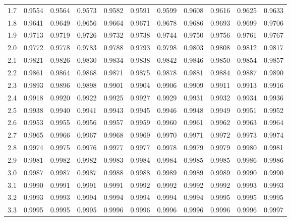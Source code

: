 {\begin{tabularx}{\textwidth}{p{0.5cm}ZZZZZZZZZZ}
1.7& 0.9554& 0.9564& 0.9573& 0.9582& 0.9591& 0.9599& 0.9608& 0.9616& 0.9625& 0.9633\\ 
1.8& 0.9641& 0.9649& 0.9656& 0.9664& 0.9671& 0.9678& 0.9686& 0.9693& 0.9699& 0.9706\\ 
1.9& 0.9713& 0.9719& 0.9726& 0.9732& 0.9738& 0.9744& 0.9750& 0.9756& 0.9761& 0.9767\\ 
2.0& 0.9772& 0.9778& 0.9783& 0.9788& 0.9793& 0.9798& 0.9803& 0.9808& 0.9812& 0.9817\\ 
2.1& 0.9821& 0.9826& 0.9830& 0.9834& 0.9838& 0.9842& 0.9846& 0.9850& 0.9854& 0.9857\\ 
2.2& 0.9861& 0.9864& 0.9868& 0.9871& 0.9875& 0.9878& 0.9881& 0.9884& 0.9887& 0.9890\\ 
2.3& 0.9893& 0.9896& 0.9898& 0.9901& 0.9904& 0.9906& 0.9909& 0.9911& 0.9913& 0.9916\\ 
2.4& 0.9918& 0.9920& 0.9922& 0.9925& 0.9927& 0.9929& 0.9931& 0.9932& 0.9934& 0.9936\\ 
2.5& 0.9938& 0.9940& 0.9941& 0.9943& 0.9945& 0.9946& 0.9948& 0.9949& 0.9951& 0.9952\\ 
2.6& 0.9953& 0.9955& 0.9956& 0.9957& 0.9959& 0.9960& 0.9961& 0.9962& 0.9963& 0.9964\\ 
2.7& 0.9965& 0.9966& 0.9967& 0.9968& 0.9969& 0.9970& 0.9971& 0.9972& 0.9973& 0.9974\\ 
2.8& 0.9974& 0.9975& 0.9976& 0.9977& 0.9977& 0.9978& 0.9979& 0.9979& 0.9980& 0.9981\\ 
2.9& 0.9981& 0.9982& 0.9982& 0.9983& 0.9984& 0.9984& 0.9985& 0.9985& 0.9986& 0.9986\\ 
3.0& 0.9987& 0.9987& 0.9987& 0.9988& 0.9988& 0.9989& 0.9989& 0.9989& 0.9990& 0.9990\\ 
3.1& 0.9990& 0.9991& 0.9991& 0.9991& 0.9992& 0.9992& 0.9992& 0.9992& 0.9993& 0.9993\\ 
3.2& 0.9993& 0.9993& 0.9994& 0.9994& 0.9994& 0.9994& 0.9994& 0.9995& 0.9995& 0.9995\\ 
3.3& 0.9995& 0.9995& 0.9995& 0.9996& 0.9996& 0.9996& 0.9996& 0.9996& 0.9996& 0.9997\\ 
\end{tabularx}
}
\endgroup
